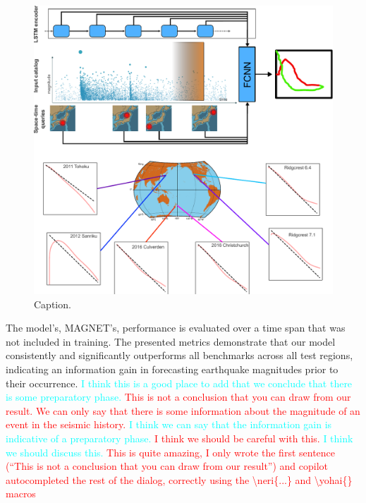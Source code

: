 \documentclass[pdflatex]{sn-jnl}
\newcommand{\yohai}[1]{{\textcolor{red}{#1}}}
\newcommand{\neri}[1]{{\textcolor{cyan}{#1}}}
\begin{document}
\begin{figure}[h!]
	\centering
        \includegraphics[width=1\textwidth]{figures/intro_fig.pdf}
	\caption{
 Caption.
}
\label{fig:intro_fig}
\end{figure}

The model's, MAGNET's, performance is evaluated over a time span that was not included in training. The presented metrics demonstrate that our model consistently and significantly outperforms all benchmarks across all test regions, indicating an information gain in forecasting earthquake magnitudes prior to their occurrence. \neri{I think this is a good place to add that we conclude that there is some preparatory phase.} \yohai{This is not a conclusion that you can draw from our result. We can only say that there is some information about the magnitude of an event in the seismic history.} \neri{I think we can say that the information gain is indicative of a preparatory phase.} \yohai{I think we should be careful with this.} \neri{I think we should discuss this.} \yohai{This is quite amazing, I only wrote the first sentence (``This is not a conclusion that you can draw from our result'') and copilot autocompleted the rest of the dialog, correctly using the \textbackslash neri\{...\} and \textbackslash yohai\{\} macros }
\end{document}

